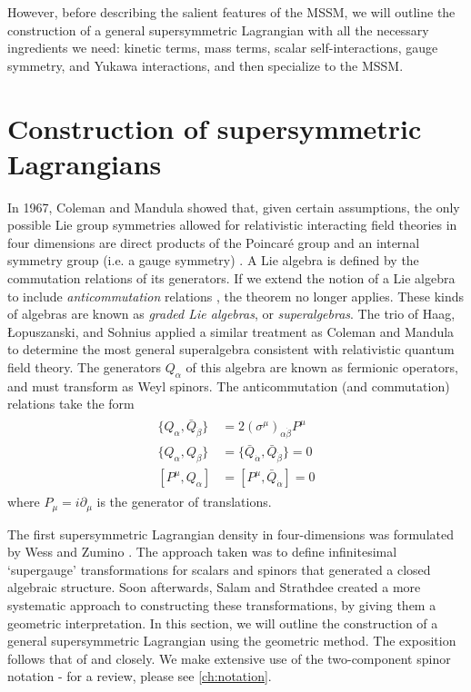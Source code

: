 However, before describing the salient features of the MSSM, we will outline the construction of a general supersymmetric Lagrangian with all the necessary ingredients we need: kinetic terms, mass terms, scalar self-interactions, gauge symmetry, and Yukawa interactions, and then specialize to the MSSM.

\section{Construction of supersymmetric Lagrangians}
In 1967, Coleman and Mandula \citep{Coleman1967} showed that, given certain assumptions, the only possible Lie group symmetries allowed for relativistic interacting field theories in four dimensions are direct products of the Poincar\'e group and an internal symmetry group (i.e. a gauge symmetry) \citep{Mandula2015}.
A Lie algebra is defined by the commutation relations of its generators. If we extend the notion of a Lie algebra to include \emph{anticommutation} relations \citep{Wess1992}, the theorem no longer applies. These kinds of algebras are known as \emph{graded Lie algebras}, or \emph{superalgebras}. The trio of Haag, Łopuszanski, and Sohnius \citep{Haag1975} applied a similar treatment as Coleman and Mandula to determine the most general superalgebra consistent with relativistic quantum field theory. The generators $Q_\alpha$ of this algebra are known as fermionic operators, and must transform as Weyl spinors. The anticommutation (and commutation) relations take the form
\begin{align}
  \begin{split}
  \{Q_\alpha, \bar{Q}_{\dot{\beta}}\} &= 2(\sigma^\mu)_{\alpha\dot{\beta}}P^\mu\\
  \{Q_\alpha, Q_\beta\} &= \{\bar{Q}_{\dot{\alpha}}, \bar{Q}_{\dot{\beta}}\} = 0\\
  [P^\mu,Q_\alpha] &= [P^\mu,\bar{Q}_{\dot{\alpha}}] = 0
\end{split}
\label{eq:susy_algebra}
\end{align}
where $P_\mu = i\partial_\mu$ is the generator of translations. 

The first supersymmetric Lagrangian density in four-dimensions was formulated by Wess and Zumino \citep{Wess1974}. The approach taken was to define infinitesimal `supergauge' transformations for scalars and spinors that generated a closed algebraic structure. Soon afterwards, Salam and Strathdee \citep{Salam1974} created a more systematic approach to constructing these transformations, by giving them a geometric interpretation. In this section, we will outline the construction of a general supersymmetric Lagrangian using the geometric method. The exposition follows that of \citep{Zee2010} and \citep{Martin1997} closely. We make extensive use of the two-component spinor notation - for a review, please see \autoref{ch:notation}.

